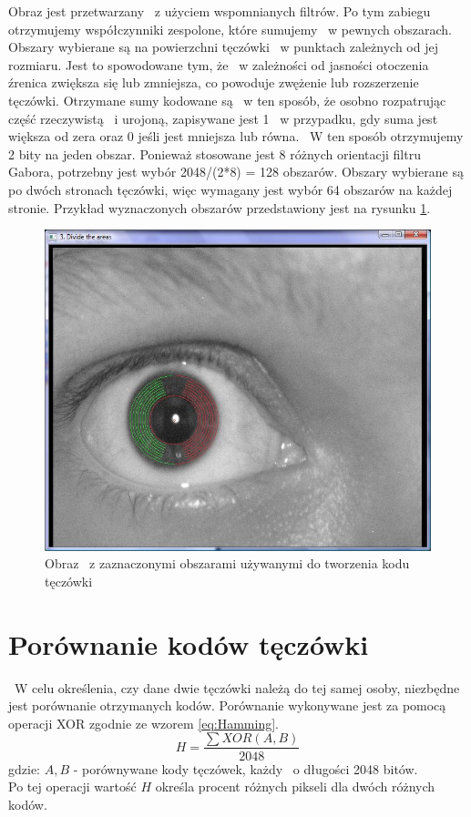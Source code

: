 Obraz jest przetwarzany ~z użyciem wspomnianych filtrów. Po tym zabiegu otrzymujemy współczynniki zespolone, które sumujemy ~w pewnych obszarach. Obszary wybierane są na powierzchni tęczówki ~w punktach zależnych od jej rozmiaru. Jest to spowodowane tym, że ~w zależności od jasności otoczenia źrenica zwiększa się lub zmniejsza, co powoduje zwężenie lub rozszerzenie tęczówki. Otrzymane sumy kodowane są ~w ten sposób, że osobno rozpatrując część rzeczywistą ~i urojoną, zapisywane jest 1 ~w przypadku, gdy suma jest większa od zera oraz 0 jeśli jest mniejsza lub równa. ~W ten sposób otrzymujemy 2 bity na jeden obszar. Ponieważ stosowane jest 8 różnych orientacji filtru Gabora, potrzebny jest wybór 2048/(2*8) = 128 obszarów. Obszary wybierane są po dwóch stronach tęczówki, więc wymagany jest wybór 64 obszarów na każdej stronie. Przykład wyznaczonych obszarów przedstawiony jest na rysunku \ref{fig:obszaryNasze}.

\begin{figure}
\begin{center}
\includegraphics[scale=0.5]{obszary.jpg}
\caption{Obraz ~z zaznaczonymi obszarami używanymi do tworzenia kodu tęczówki}
\label{fig:obszaryNasze}
\end{center}
\end{figure}

\section{Porównanie kodów tęczówki}
\label{sec:porownanieKodow}
~W celu określenia, czy dane dwie tęczówki należą do tej samej osoby, niezbędne jest porównanie otrzymanych kodów. Porównanie wykonywane jest za pomocą operacji XOR zgodnie ze wzorem \ref{eq:Hamming}.
\begin{equation}
\label{eq:Hamming}
H = \frac{\sum XOR(A,B)}{2048}
\end{equation}
gdzie:
$A, B$ - porównywane kody tęczówek, każdy ~o długości 2048 bitów.\\
Po tej operacji wartość $H$ określa procent różnych pikseli dla dwóch różnych kodów.

